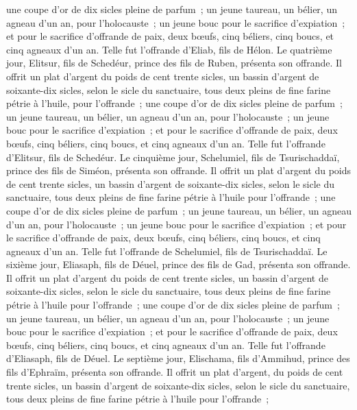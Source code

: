 \begin{multicols}{2}
une coupe d'or de dix sicles pleine de parfum~;
un jeune taureau, un bélier, un agneau d'un an, pour l'holocauste~;
un jeune bouc pour le sacrifice d'expiation~;
et pour le sacrifice d'offrande de paix, deux bœufs, cinq béliers, cinq boucs, et cinq agneaux d'un an. Telle fut l'offrande d'Eliab, fils de Hélon.
Le quatrième jour, Elitsur, fils de Schedéur, prince des fils de Ruben, présenta son offrande.
Il offrit un plat d'argent du poids de cent trente sicles, un bassin d'argent de soixante-dix sicles, selon le sicle du sanctuaire, tous deux pleins de fine farine pétrie à l'huile, pour l'offrande~;
une coupe d'or de dix sicles pleine de parfum~;
un jeune taureau, un bélier, un agneau d'un an, pour l'holocauste~;
un jeune bouc pour le sacrifice d'expiation~;
et pour le sacrifice d'offrande de paix, deux bœufs, cinq béliers, cinq boucs, et cinq agneaux d'un an. Telle fut l'offrande d'Elitsur, fils de Schedéur.
Le cinquième jour, Schelumiel, fils de Tsurischaddaï, prince des fils de Siméon, présenta son offrande.
Il offrit un plat d'argent du poids de cent trente sicles, un bassin d'argent de soixante-dix sicles, selon le sicle du sanctuaire, tous deux pleins de fine farine pétrie à l'huile pour l'offrande~;
une coupe d'or de dix sicles pleine de parfum~;
un jeune taureau, un bélier, un agneau d'un an, pour l'holocauste~;
un jeune bouc pour le sacrifice d'expiation~;
et pour le sacrifice d'offrande de paix, deux bœufs, cinq béliers, cinq boucs, et cinq agneaux d'un an. Telle fut l'offrande de Schelumiel, fils de Tsurischaddaï.
Le sixième jour, Eliasaph, fils de Déuel, prince des fils de Gad, présenta son offrande.
Il offrit un plat d'argent du poids de cent trente sicles, un bassin d'argent de soixante-dix sicles, selon le sicle du sanctuaire, tous deux pleins de fine farine pétrie à l'huile pour l'offrande~;
une coupe d'or de dix sicles pleine de parfum~;
un jeune taureau, un bélier, un agneau d'un an, pour l'holocauste~;
un jeune bouc pour le sacrifice d'expiation~;
et pour le sacrifice d'offrande de paix, deux bœufs, cinq béliers, cinq boucs, et cinq agneaux d'un an. Telle fut l'offrande d'Eliasaph, fils de Déuel.
Le septième jour, Elischama, fils d'Ammihud, prince des fils d'Ephraïm, présenta son offrande.
Il offrit un plat d'argent, du poids de cent trente sicles, un bassin d'argent de soixante-dix sicles, selon le sicle du sanctuaire, tous deux pleins de fine farine pétrie à l'huile pour l'offrande~;

\end{multicols}
